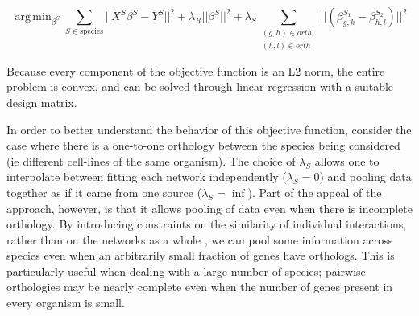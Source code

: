 \documentclass[11pt]{article}
\DeclareMathOperator*{\argmin}{arg\,min}
\begin{document}
\begin{equation}
\argmin_{\beta^S} \displaystyle\sum_{S \in \text{species}} \vert \vert X^S\beta^S - Y^S \vert \vert ^2 + \lambda_R \vert \vert \beta^S \vert \vert ^2 + \displaystyle \lambda_S \sum_{\substack{(g,h) \in orth,\\
 (h,l) \in orth}} \vert \vert (\beta^{S_1}_{g,k} - \beta^{S_2}_{h,l}) \vert \vert ^2
\end{equation}

Because every component of the objective function is an L2 norm, the entire problem is convex, and can be solved through linear regression with a suitable design matrix. %

In order to better understand the behavior of this objective function, consider the case where there is a one-to-one orthology between the species being considered (ie different cell-lines of the same organism). The choice of $\lambda_S$ allows one to interpolate between fitting each network independently ($\lambda_S=0$) and pooling data together as if it came from one source ($\lambda_S=\inf$). Part of the appeal of the approach, however, is that it allows pooling of data even when there is incomplete orthology. By introducing constraints on the similarity of individual interactions, rather than on the networks as a whole \cite{liu2011temporal}, we can pool some information across species even when an arbitrarily small fraction of genes have orthologs. This is particularly useful when dealing with a large number of species; pairwise orthologies may be nearly complete even when the number of genes present in every organism is small. 
\end{document}
